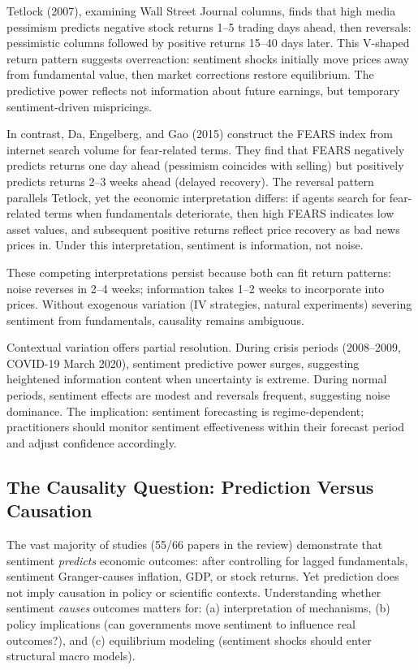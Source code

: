 \documentclass[11pt]{article}
\begin{document}
Tetlock (2007), examining Wall Street Journal columns, finds that high media pessimism predicts negative stock returns 1--5 trading days ahead, then reversals: pessimistic columns followed by positive returns 15--40 days later. This V-shaped return pattern suggests overreaction: sentiment shocks initially move prices away from fundamental value, then market corrections restore equilibrium. The predictive power reflects not information about future earnings, but temporary sentiment-driven mispricings.

In contrast, Da, Engelberg, and Gao (2015) construct the FEARS index from internet search volume for fear-related terms. They find that FEARS negatively predicts returns one day ahead (pessimism coincides with selling) but positively predicts returns 2--3 weeks ahead (delayed recovery). The reversal pattern parallels Tetlock, yet the economic interpretation differs: if agents search for fear-related terms when fundamentals deteriorate, then high FEARS indicates low asset values, and subsequent positive returns reflect price recovery as bad news prices in. Under this interpretation, sentiment is information, not noise.

These competing interpretations persist because both can fit return patterns: noise reverses in 2--4 weeks; information takes 1--2 weeks to incorporate into prices. Without exogenous variation (IV strategies, natural experiments) severing sentiment from fundamentals, causality remains ambiguous.

Contextual variation offers partial resolution. During crisis periods (2008--2009, COVID-19 March 2020), sentiment predictive power surges, suggesting heightened information content when uncertainty is extreme. During normal periods, sentiment effects are modest and reversals frequent, suggesting noise dominance. The implication: sentiment forecasting is regime-dependent; practitioners should monitor sentiment effectiveness within their forecast period and adjust confidence accordingly.

\subsection{The Causality Question: Prediction Versus Causation}

The vast majority of studies (55/66 papers in the review) demonstrate that sentiment \emph{predicts} economic outcomes: after controlling for lagged fundamentals, sentiment Granger-causes inflation, GDP, or stock returns. Yet prediction does not imply causation in policy or scientific contexts. Understanding whether sentiment \emph{causes} outcomes matters for: (a) interpretation of mechanisms, (b) policy implications (can governments move sentiment to influence real outcomes?), and (c) equilibrium modeling (sentiment shocks should enter structural macro models).
\end{document}
